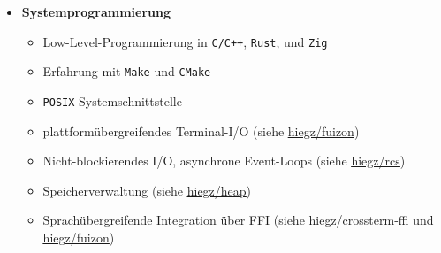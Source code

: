 \documentclass[]{article}
\begin{document}
\begin{minipage}[t]{0.49\linewidth}
    \begin{itemize}[leftmargin=0.15in, rightmargin=0.15in, label={}]
        \item {\large\bfseries Systemprogrammierung}

            \begin{itemize}
                \item Low-Level-Programmierung in \verb|C/C++|, \verb|Rust|, und \verb|Zig|
                \item Erfahrung mit \verb|Make| und \verb|CMake|
                \item \verb|POSIX|-Systemschnittstelle
                \item plattformübergreifendes Terminal-I/O (siehe \href{https://github.com/hiegz/fuizon}{\ttfamily \underline{hiegz/fuizon}})
                \item Nicht-blockierendes I/O, asynchrone Event-Loops (siehe \href{https://github.com/hiegz/rcs}{\ttfamily \underline{hiegz/rcs}})
                \item Speicherverwaltung (siehe \href{https://github.com/hiegz/heap}{\ttfamily \underline{hiegz/heap}})
                \item Sprachübergreifende Integration über FFI (siehe
                    \href{https://github.com/hiegz/crossterm-ffi}{\ttfamily \underline{hiegz/crossterm-ffi}} und
                    \href{https://github.com/hiegz/fuizon}{\ttfamily \underline{hiegz/fuizon}})
            \end{itemize}
    \end{itemize}
\end{minipage}
\hspace{10pt}
\end{document}
